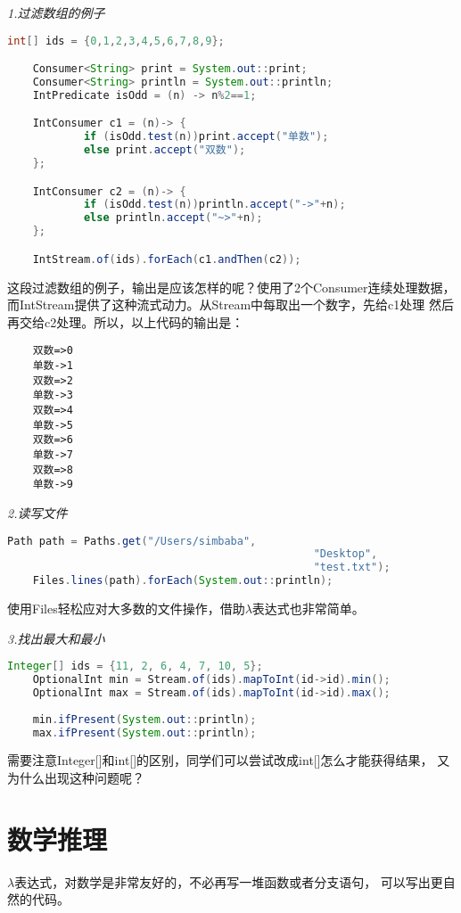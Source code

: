 \emph{1.过滤数组的例子}
\begin{lstlisting}[language=java]
	int[] ids = {0,1,2,3,4,5,6,7,8,9};

	Consumer<String> print = System.out::print;
	Consumer<String> println = System.out::println;
	IntPredicate isOdd = (n) -> n%2==1;

	IntConsumer c1 = (n)-> {
			if (isOdd.test(n))print.accept("单数");
			else print.accept("双数");
	};

	IntConsumer c2 = (n)-> {
			if (isOdd.test(n))println.accept("->"+n);
			else println.accept("~>"+n);
	};

	IntStream.of(ids).forEach(c1.andThen(c2));
\end{lstlisting}

这段过滤数组的例子，输出是应该怎样的呢？使用了2个Consumer连续处理数据，
而IntStream提供了这种流式动力。从Stream中每取出一个数字，先给c1处理
然后再交给c2处理。所以，以上代码的输出是：
\begin{lstlisting}
	双数=>0
	单数->1
	双数=>2
	单数->3
	双数=>4
	单数->5
	双数=>6
	单数->7
	双数=>8
	单数->9
\end{lstlisting}

\emph{2.读写文件}
\begin{lstlisting}[language=java]
	Path path = Paths.get("/Users/simbaba",
												"Desktop",
												"test.txt");
	Files.lines(path).forEach(System.out::println);
\end{lstlisting}
使用Files轻松应对大多数的文件操作，借助$\lambda$表达式也非常简单。

\emph{3.找出最大和最小}
\begin{lstlisting}[language=java]
	Integer[] ids = {11, 2, 6, 4, 7, 10, 5};
	OptionalInt min = Stream.of(ids).mapToInt(id->id).min();
	OptionalInt max = Stream.of(ids).mapToInt(id->id).max();
	
	min.ifPresent(System.out::println);
	max.ifPresent(System.out::println);
\end{lstlisting}
需要注意Integer[]和int[]的区别，同学们可以尝试改成int[]怎么才能获得结果，
又为什么出现这种问题呢？

\section{数学推理}
$\lambda$表达式，对数学是非常友好的，不必再写一堆函数或者分支语句，
可以写出更自然的代码。


